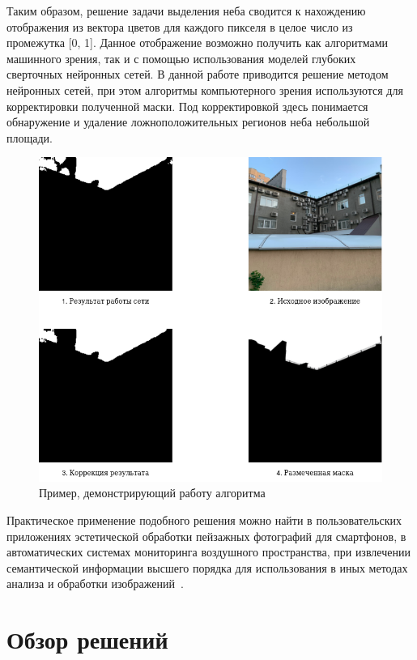 Таким образом, решение задачи выделения неба сводится к нахождению отображения из вектора цветов для каждого пикселя в целое число из промежутка [0, 1]. Данное отображение возможно получить как алгоритмами машинного зрения, так и с помощью использования моделей глубоких сверточных нейронных сетей. В данной работе приводится решение методом нейронных сетей, при этом алгоритмы компьютерного зрения используются для корректировки полученной маски. Под корректировкой здесь понимается обнаружение и удаление ложноположительных регионов неба небольшой площади.

\begin{figure}[H]
 \centering
 \includegraphics[width=\textwidth]{img/sky_segmentation.png}
 \caption{Пример, демонстрирующий работу алгоритма}
 \label{fig:sky_seg}
\end{figure}

Практическое применение подобного решения можно найти в пользовательских приложениях эстетической обработки пейзажных фотографий для смартфонов, в автоматических системах мониторинга воздушного пространства, при извлечении семантической информации высшего порядка для использования в иных методах анализа и обработки изображений~\autocite{7415405}.

\section{Обзор решений}

